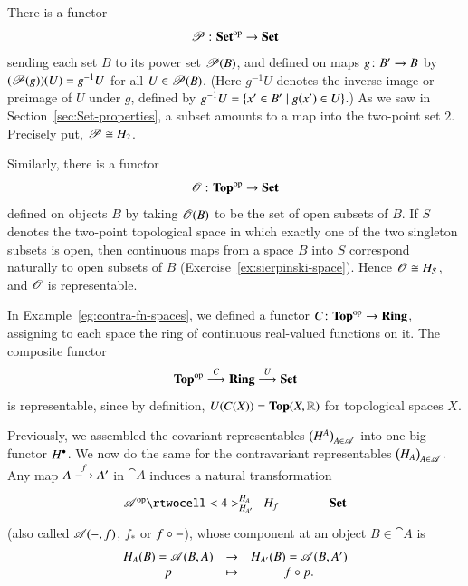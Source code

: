 \begin{example}
There is a functor
\[
\pset\from \Set^\op \to \Set%
%
\ntn{power-set-ftr}
%
\]
sending each set $B$ to its power%
%
%
set $\operatorname{\mathscr{P}}(B)$, and defined on maps $g\from B' \to B$ by $(\operatorname{\mathscr{P}}(g))(U) =
g^{-1}U$ for all $U \in \operatorname{\mathscr{P}}(B)$.  (Here $g^{-1}U$ denotes the inverse%
%
%
image or preimage of $U$ under $g$, defined by $g^{-1} U = \{ x' \in B'
\mathrel{|} g(x') \in U \}$.)  As we saw in Section~\ref{sec:Set-properties}, a
subset amounts to a map into the two-point%
%
%
set $2$.  Precisely put, $\operatorname{\mathscr{P}} \cong H_2$.
\end{example}

\begin{example}
\label{eg:contra-rep-sier}
Similarly, there is a functor
\[
\oset\from\Tp^\op \to \Set%
%
\ntn{oset-ftr}
%
\index{topological space!open subset of}%
\index{open subset}%
\index{set!open}
%
\]
defined on objects $B$ by taking $\operatorname{\mathscr{O}}(B)$ to be the set of open subsets
of $B$.  If $S$ denotes the two-point%
%
%
topological space in which exactly one of the two singleton subsets is
open, then continuous maps from a space $B$ into $S$ correspond naturally
to open subsets of $B$ (Exercise~\ref{ex:sierpinski-space}).  Hence $\operatorname{\mathscr{O}}
\cong H_S$, and $\operatorname{\mathscr{O}}$ is representable.
\end{example}

\begin{example}
In Example~\ref{eg:contra-fn-spaces}, we defined a functor $C\from \Tp^\op
\to \Ring$, assigning to each space the ring%
%
%
of continuous real-valued functions%
%
%
on it.  The composite functor
\[
\mathbf{Top}^{\mathrm{op}} \stackrel{C}{\longrightarrow} \mathbf{Ring} \stackrel{U}{\longrightarrow} \mathbf{Set}
\]
is representable, since by definition, $U(C(X)) = \mathbf{Top}(X, \mathbb{R})$ for
topological spaces $X$.
\end{example}

Previously, we assembled the covariant representables $\bigl( H^A
\bigr)_{A \in \mathscr{A}}$ into one big functor $H^\bullet$.  We now do the same
for the contravariant representables $\bigl( H_A \bigr)_{A \in \mathscr{A}}$.
Any map $A \stackrel{f}{\longrightarrow} A'$ in $\cat{A}$ induces a natural transformation
\[
\xymatrix@C+1em{
\cat{A}^\op \rtwocell<4>^{\h_A}_{\h_{A'}}{\hspace{.5em}\h_f} &\Set%
%
\ntn{hom-in-map}
%
}
\]
(also called $\mathscr{A}(-, f)$,%
%
%
$f_*$%
%
%
or $f \mathbin{\circ} -$),%
%
%
whose component at an object $B \in \cat{A}$ is
\[
\begin{array}{ccc}
H_A(B) = \mathscr{A}(B, A)  &\to               &
H_{A'}(B) = \mathscr{A}(B, A')     \\
p                       &\mapsto            &
f \mathbin{\circ} p.
\end{array}
\]

